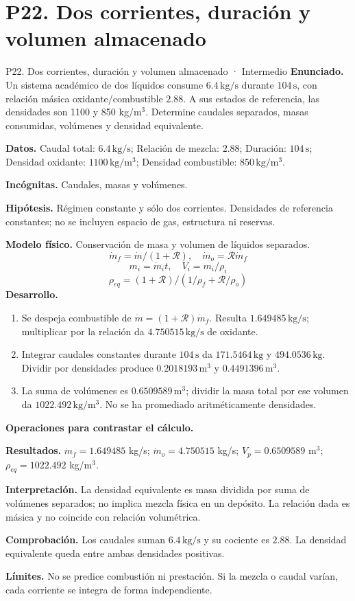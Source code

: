 \section{P22. Dos corrientes, duración y volumen almacenado}
\begin{studiumworked}{P22. Dos corrientes, duración y volumen almacenado · Intermedio}
\textbf{Enunciado.} Un sistema académico de dos líquidos consume $6.4\,\mathrm{kg/s}$ durante $104\,\mathrm{s}$, con relación másica oxidante/combustible $2.88$. A sus estados de referencia, las densidades son 1100 y 850 kg/m$^3$. Determine caudales separados, masas consumidas, volúmenes y densidad equivalente.

\textbf{Datos.} Caudal total: $6.4\,\mathrm{kg/s}$; Relación de mezcla: $2.88$; Duración: $104\,\mathrm{s}$; Densidad oxidante: $1100\,\mathrm{kg/m^3}$; Densidad combustible: $850\,\mathrm{kg/m^3}$.

\textbf{Incógnitas.} Caudales, masas y volúmenes.

\textbf{Hipótesis.} Régimen constante y sólo dos corrientes. Densidades de referencia constantes; no se incluyen espacio de gas, estructura ni reservas.

\textbf{Modelo físico.} Conservación de masa y volumen de líquidos separados.
\[\dot m_f=\dot m/(1+\mathcal R),\quad \dot m_o=\mathcal R\dot m_f\]
\[m_i=\dot m_it,\quad V_i=m_i/\rho_i\]
\[\rho_{eq}=(1+\mathcal R)/(1/\rho_f+\mathcal R/\rho_o)\]
\textbf{Desarrollo.}
\begin{enumerate}
\item Se despeja combustible de $\dot m=(1+\mathcal R)\dot m_f$. Resulta $1.649485\,\mathrm{kg/s}$; multiplicar por la relación da $4.750515\,\mathrm{kg/s}$ de oxidante.
\item Integrar caudales constantes durante $104\,\mathrm{s}$ da $171.5464\,\mathrm{kg}$ y $494.0536\,\mathrm{kg}$. Dividir por densidades produce $0.2018193\,\mathrm{m^3}$ y $0.4491396\,\mathrm{m^3}$.
\item La suma de volúmenes es $0.6509589\,\mathrm{m^3}$; dividir la masa total por ese volumen da $1022.492\,\mathrm{kg/m^3}$. No se ha promediado aritméticamente densidades.
\end{enumerate}
\textbf{Operaciones para contrastar el cálculo.}

\textbf{Resultados.} $\dot m_f=1.649485$ kg/s; $\dot m_o=4.750515$ kg/s; $V_p=0.6509589$ m$^3$; $\rho_{eq}=1022.492$ kg/m$^3$.

\textbf{Interpretación.} La densidad equivalente es masa dividida por suma de volúmenes separados; no implica mezcla física en un depósito. La relación dada es másica y no coincide con relación volumétrica.

\textbf{Comprobación.} Los caudales suman $6.4\,\mathrm{kg/s}$ y su cociente es $2.88$. La densidad equivalente queda entre ambas densidades positivas.

\textbf{Límites.} No se predice combustión ni prestación. Si la mezcla o caudal varían, cada corriente se integra de forma independiente.
\end{studiumworked}
